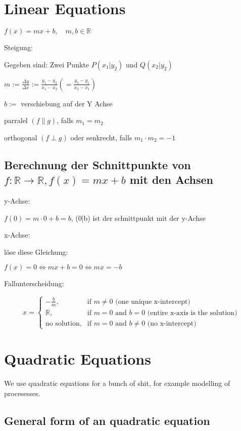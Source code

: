 \documentclass{article}
\begin{document}
\section{Linear Equations}
$f(x) = mx+b, \quad m,b \in \mathbb{R} $

Steigung:

Gegeben sind: Zwei Punkte $P(x_1|y_2) \text{ und } Q(x_2|y_2)$

$m := \frac{\Delta y}{\Delta x}:=\frac{y_1 - y_2}{x_1 - x_2} (= \frac{y_2-y_1}{x_2-x_1})$

$b :=$ verschiebung auf der Y Achse

parralel $(f \parallel g)$, falls $m_1 = m_2$

orthogonal $ (f \perp g) $ oder senkrecht, falls $m_1 \cdot m_2 = -1$

\subsection{Berechnung der Schnittpunkte von $f: \mathbb{R} \rightarrow \mathbb{R}, f(x)=mx+b$ mit den Achsen}

y-Achse:

$f(0) = m \cdot 0 + b = b$, (0|b) ist der schnittpunkt mit der y-Achse

x-Achse:

löse diese Gleichung:

$f(x) = 0  \Longleftrightarrow mx + b = 0 \Longleftrightarrow mx = -b $

Fallunterscheidung:

\[
x =
\begin{cases} 
-\frac{b}{m}, & \text{if } m \neq 0 \text{ (one unique x-intercept)} \\
\mathbb{R}, & \text{if } m = 0 \text{ and } b = 0 \text{ (entire x-axis is the solution)} \\
\text{no solution}, & \text{if } m = 0 \text{ and } b \neq 0 \text{ (no x-intercept)}
\end{cases}
\]


\section{Quadratic Equations}
We use quadratic equations for a bunch of shit, for example modelling of
procesesses.

\subsection{General form of an quadratic equation}
\end{document}
